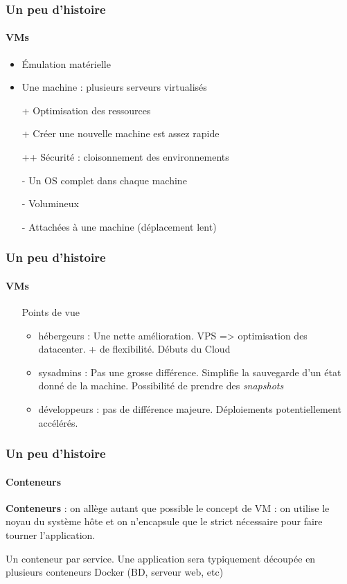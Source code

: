 \documentclass[11pt]{beamer}
\begin{document}
\begin{frame}
\frametitle{Un peu d'histoire}
\framesubtitle{VMs}
\begin{itemize}
	\item Émulation matérielle
	\item Une machine : plusieurs serveurs virtualisés
	\vspace{0.5em}
	\item[+] Optimisation des ressources
	\item[+] Créer une nouvelle machine est assez rapide
	\item[++] Sécurité : cloisonnement des environnements
	\item[-] Un OS complet dans chaque machine
	\item[-] Volumineux
	\item[-] Attachées à une machine (déplacement lent)
\end{itemize}
\end{frame}

\begin{frame}
\frametitle{Un peu d'histoire}
\framesubtitle{VMs}
\begin{itemize}
	\item[] Points de vue
	\begin{itemize}
		\item hébergeurs : Une nette amélioration. VPS => optimisation des datacenter. + de flexibilité. Débuts du Cloud
		\item sysadmins : Pas une grosse différence. Simplifie la sauvegarde d'un état donné de la machine. Possibilité de prendre des \textit{snapshots}
		\item développeurs : pas de différence majeure. Déploiements potentiellement accélérés.
	\end{itemize}
\end{itemize}
\end{frame}

\begin{frame}
\frametitle{Un peu d'histoire}
\framesubtitle{Conteneurs}
\textbf{Conteneurs} : on allège autant que possible le concept de VM : on utilise le noyau du système hôte et on n'encapsule que le strict nécessaire pour faire tourner l'application.
\vspace{2em}

Un conteneur par service. Une application sera typiquement découpée en plusieurs conteneurs Docker (BD, serveur web, etc)
\end{frame}
\end{document}
